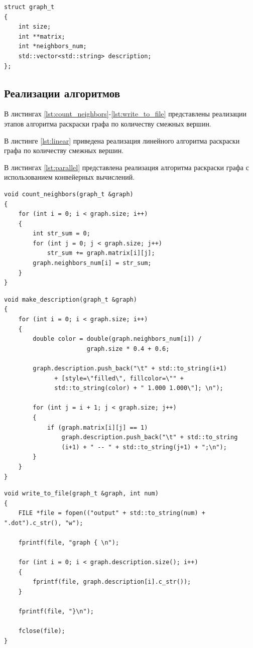 \clearpage

\begin{lstlisting}[label=lst:graph_t, caption=Структура graph\_t]
struct graph_t
{
    int size;
    int **matrix;
    int *neighbors_num;
    std::vector<std::string> description;
};
\end{lstlisting}

\subsection{Реализации алгоритмов}
В листингах \ref{lst:count_neighbors}-\ref{lst:write_to_file} представлены реализации этапов алгоритма раскраски графа по количеству смежных вершин. 

В листинге \ref{lst:linear} приведена реализация линейного алгоритма раскраски графа по количеству смежных вершин.

В листингах \ref{lst:parallel} представлена реализация алгоритма раскраски графа с использованием конвейерных вычислений. 

\clearpage

\begin{lstlisting}[label=lst:count_neighbors, caption=Этап вычисления числа соседей каждого узла]
void count_neighbors(graph_t &graph)
{
    for (int i = 0; i < graph.size; i++)
    {
        int str_sum = 0;
        for (int j = 0; j < graph.size; j++)
            str_sum += graph.matrix[i][j];
        graph.neighbors_num[i] = str_sum;
    }
}
\end{lstlisting}

\begin{lstlisting}[label=lst:make_description, caption=Этап составления описания графа для graphviz]
void make_description(graph_t &graph)
{
    for (int i = 0; i < graph.size; i++)
    {
        double color = double(graph.neighbors_num[i]) / 
                       graph.size * 0.4 + 0.6;

        graph.description.push_back("\t" + std::to_string(i+1) 
              + [style=\"filled\", fillcolor=\"" + 
              std::to_string(color) + " 1.000 1.000\"]; \n");
        
        for (int j = i + 1; j < graph.size; j++)
        {
            if (graph.matrix[i][j] == 1)
                graph.description.push_back("\t" + std::to_string
                (i+1) + " -- " + std::to_string(j+1) + ";\n");
        }
    }
}
\end{lstlisting}
\clearpage

\begin{lstlisting}[label=lst:write_to_file, caption=Этап вывода описания графа в файл с расширением dot]
void write_to_file(graph_t &graph, int num)
{
    FILE *file = fopen(("output" + std::to_string(num) + ".dot").c_str(), "w");

    fprintf(file, "graph { \n");

    for (int i = 0; i < graph.description.size(); i++)
    {
        fprintf(file, graph.description[i].c_str());
    }

    fprintf(file, "}\n");

    fclose(file);
}
\end{lstlisting}

